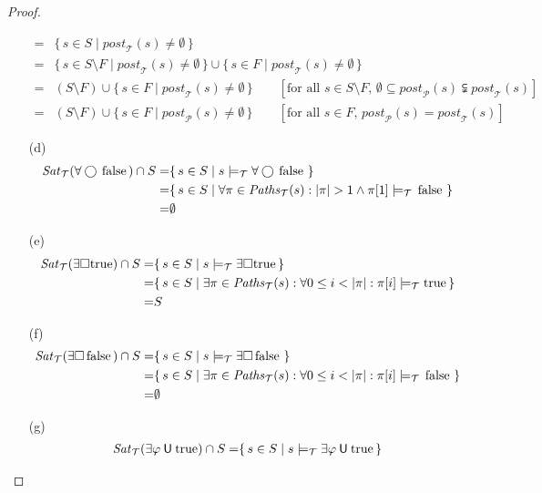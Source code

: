 \documentclass[12pt]{article}
\newcommand{\always}{\Box}
\newcommand{\nxt}{\bigcirc}
\newcommand{\until}{\mathbin{\sf U}}
\newcommand{\TRUE}{\mbox{\lstinline{true}}}
\newcommand{\FALSE}{\mbox{\lstinline{false}}}
\theoremstyle{definition}
\newcommand{\comment}[1]{\hspace{2em}[\mbox{#1}]}
\begin{document}
\begin{proof}
\begin{itemize}
\begin{align*}
= & \{\, s \in S \mid \mathit{post}_{\mathcal{T}}(s) \not= \emptyset \,\}\\
= & \{\, s \in S \setminus F \mid \mathit{post}_{\mathcal{T}}(s) \not= \emptyset \,\} \cup \{\, s \in F \mid \mathit{post}_{\mathcal{T}}(s) \not= \emptyset \,\}\\
= & (S \setminus F) \cup \{\, s \in F \mid \mathit{post}_{\mathcal{T}}(s) \not= \emptyset \,\}
\comment{for all $s \in S \setminus F$, $\emptyset \subseteq \mathit{post}_{\mathcal{P}}(s) \subsetneqq \mathit{post}_{\mathcal{T}}(s)$}\\
= & (S \setminus F) \cup \{\, s \in F \mid \mathit{post}_{\mathcal{P}}(s) \not= \emptyset \,\}
\comment{for all $s \in F$, $\mathit{post}_{\mathcal{P}}(s) = \mathit{post}_{\mathcal{T}}(s)$}
\end{align*}
\item[(d)]
\begin{align*}
\mathit{Sat}_{\mathcal{T}}(\forall \nxt \FALSE) \cap S
= & \{\, s \in S \mid s \models_{\mathcal{T}} \forall \nxt \FALSE \,\}\\
= & \{\, s \in S \mid \forall \pi \in \mathit{Paths}_{\mathcal{T}}(s) : |\pi| > 1 \wedge \pi[1] \models_{\mathcal{T}} \FALSE \,\}\\
= & \emptyset
\end{align*}
\item[(e)]
\begin{align*}
\mathit{Sat}_{\mathcal{T}}(\exists \always \TRUE) \cap S
= & \{\, s \in S \mid s \models_{\mathcal{T}} \exists \always \TRUE \,\}\\
= & \{\, s \in S \mid \exists \pi \in \mathit{Paths}_{\mathcal{T}}(s) : \forall 0 \leq i < |\pi| : \pi[i] \models_{\mathcal{T}} \TRUE \,\}\\
= & S
\end{align*}
\item[(f)]
\begin{align*}
\mathit{Sat}_{\mathcal{T}}(\exists \always \FALSE) \cap S
= & \{\, s \in S \mid s \models_{\mathcal{T}} \exists \always \FALSE \,\}\\
= & \{\, s \in S \mid \exists \pi \in \mathit{Paths}_{\mathcal{T}}(s) : \forall 0 \leq i < |\pi| : \pi[i] \models_{\mathcal{T}} \FALSE \,\}\\
= & \emptyset
\end{align*}
\item[(g)]
\begin{align*}
\mathit{Sat}_{\mathcal{T}}(\exists \varphi \until \TRUE) \cap S
= & \{\, s \in S \mid s \models_{\mathcal{T}} \exists \varphi \until \TRUE \,\}\\

\end{align*}
\end{itemize}
\end{proof}
\end{document}
